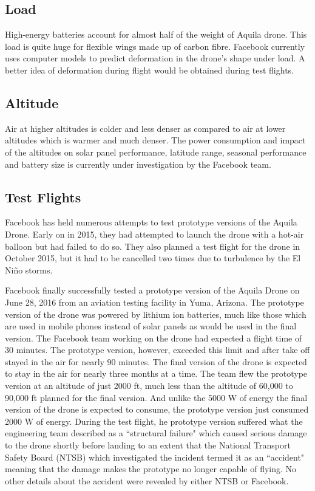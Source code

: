 \documentclass{llncs}
\begin{document}
           \subsection{Load}
           High-energy batteries account for almost half of the weight of Aquila drone. This load is quite huge for flexible wings made up of carbon fibre. Facebook currently uses computer models to predict deformation in the drone's shape under load. A better idea of deformation during flight would be obtained during test flights. 

           \subsection{Altitude}
           	Air at higher altitudes is colder and less denser as compared to air at lower altitudes which is warmer and much denser. The power consumption and impact of the altitudes on solar panel performance, latitude range, seasonal performance and battery size is currently under investigation by the Facebook team.
	
	
	\subsection{Test Flights}
	Facebook has held numerous attempts to test prototype versions of the Aquila Drone. Early on in 2015, they had attempted to launch the drone with a hot-air balloon but had failed to do so. They also planned a test flight for the drone in October 2015, but it had to be cancelled two times due to turbulence by the El Ni\~{n}o storms\cite{drone_test_flights}. 
	
	Facebook finally successfully tested a prototype version of the Aquila Drone on June 28, 2016 from an aviation testing facility in Yuma, 
	Arizona\cite{drone_test_flights}. The prototype version of the drone was powered by lithium ion batteries, much like those which are used 
	in mobile phones instead of solar panels as would be used in the final version. The Facebook team working on the drone had expected a 
	flight time of 30 minutes. The prototype version, however, exceeded this limit and after take off stayed in the air for nearly 90 minutes. 
	The final version of the drone is expected to stay in the air for nearly three months at a time. The team flew the prototype version at an 
	altitude of just 2000 ft, much less than the altitude of 60,000 to 90,000 ft planned for the final version. And unlike the 5000 W of 
	energy the final version of the drone is expected to consume, the prototype version just consumed 2000 W of energy. During the test 
	flight, he prototype version suffered what the engineering team described as a ``structural failure" which caused serious damage to the 
	drone shortly before landing to an extent that the National Transport Safety Board (NTSB) which investigated the incident termed it as an 
	``accident" meaning that the damage makes the prototype no longer capable of flying\cite{drone_failure}. No other details about the accident were revealed by 
	either NTSB or Facebook.   
	
\end{document}
